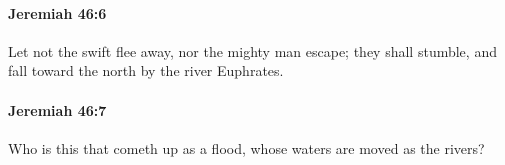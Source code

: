 		\paragraph{Jeremiah 46:6} %
			\label{JEREMIAH-46-6}

			Let not the swift flee away, nor the mighty man escape; they shall stumble, and fall toward the north by the river Euphrates.


		\paragraph{Jeremiah 46:7} %
			\label{JEREMIAH-46-7}

			Who is this that cometh up as a flood, whose waters are moved as the rivers?


